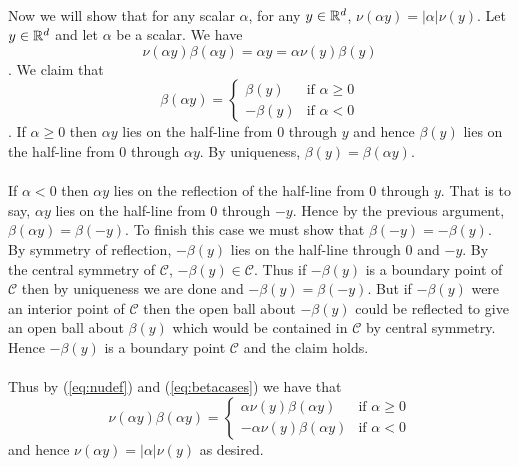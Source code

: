 \documentclass[letterpaper,12pt,oneside,onecolumn]{article}
\newcommand{\cC}{\mathcal{C}} \newcommand{\cD}{\mathcal{D}}
\begin{document}
\paragraph{}
Now we will show that for any scalar $\alpha$, for any $y \in \mathbb{R}^d$, $\nu(\alpha y) = |\alpha| \nu(y)$. Let $y \in \mathbb{R}^d$ and let $\alpha$ be a scalar. We have
\begin{equation}
\nu(\alpha y) \beta(\alpha y) = \alpha y = \alpha \nu(y) \beta(y) \label{eq:nudef}
\end{equation}
. We claim that \begin{equation} \beta(\alpha y) = \begin{cases} \beta(y) &\text{if $\alpha \geq 0$} \\
-\beta(y) &\text{if $\alpha <0$}\end{cases}\label{eq:betacases}\end{equation}
. If $\alpha \geq 0$ then $\alpha y$ lies on the half-line from $0$ through $y$ and hence $\beta(y)$ lies on the half-line from $0$ through $\alpha y$. By uniqueness, $\beta(y) = \beta(\alpha y)$.
\paragraph{}
If $\alpha < 0$ then $\alpha y$ lies on the reflection of the half-line from $0$ through $y$. That is to say, $\alpha y$ lies on the half-line from $0$ through $-y$. Hence by the previous argument, $\beta(\alpha y) = \beta(-y)$. To finish this case we must show that $\beta(-y) = -\beta(y)$. By symmetry of reflection, $-\beta(y)$ lies on the half-line through $0$ and $-y$. By the central symmetry of $\cC$, $-\beta(y) \in \cC$. Thus if $-\beta(y)$ is a boundary point of $\cC$ then by uniqueness we are done and $-\beta(y) = \beta(-y)$. But if $-\beta(y)$ were an interior point of $\cC$ then the open ball about $-\beta(y)$ could be reflected to give an open ball about $\beta(y)$ which would be contained in $\cC$ by central symmetry. Hence $-\beta(y)$ is a boundary point $\cC$ and the claim holds.
\paragraph{}
Thus by (\ref{eq:nudef}) and (\ref{eq:betacases}) we have that
$$\nu(\alpha y) \beta(\alpha y) = \begin{cases}\alpha \nu(y) \beta(\alpha y) &\text{if $\alpha \geq 0$}\\
-\alpha \nu(y) \beta(\alpha y) &\text{if $\alpha < 0$} \end{cases}$$
and hence $\nu(\alpha y) = |\alpha| \nu(y)$ as desired.
\end{document}
